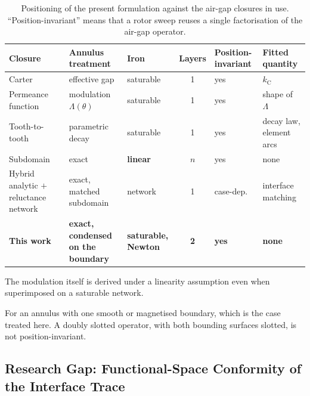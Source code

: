 \documentclass[10pt,a4paper,twocolumn]{article}
\theoremstyle{plain}
\theoremstyle{remark}
\begin{document}
\begin{table}[!t]
\centering
\footnotesize
\begin{threeparttable}
\begin{tabular}{@{}p{26mm}p{27mm}p{19mm}cp{16mm}p{22mm}@{}}
\toprule
Closure & Annulus treatment & Iron & Layers & Position-invariant & Fitted quantity\\
\midrule
Carter~\cite{carter,pyrhonen}      & effective gap             & saturable & 1 & yes & $k_{\mathrm{C}}$\\[2pt]
Permeance function~\cite{zhu1993,zarko2006b} & modulation $\Lambda(\theta)$ & saturable\tnote{*} & 1 & yes & shape of $\Lambda$\\[2pt]
Tooth-to-tooth~\cite{silva2023,ghods2022} & parametric decay & saturable & 1 & yes & decay law, element arcs\\[2pt]
Subdomain~\cite{lubin2010,dubas,boughrara} & exact             & \textbf{linear} & $n$ & yes & none\\[2pt]
Hybrid analytic $+$ reluctance network~\cite{ouagued2016,belmahi2026} & exact, matched subdomain & network & 1 & case-dep. & interface matching\\[2pt]
\textbf{This work}                 & \textbf{exact, condensed on the boundary} & \textbf{saturable, Newton} & \textbf{2} & \textbf{yes\tnote{\dag}} & \textbf{none}\\
\bottomrule
\end{tabular}
\begin{tablenotes}[flushleft]\footnotesize
\item[*] The modulation itself is derived under a linearity assumption
even when superimposed on a saturable network.
\item[\dag] For an annulus with one smooth or magnetised boundary,
which is the case treated here. A doubly slotted operator, with both
bounding surfaces slotted, is not position-invariant.
\end{tablenotes}
\end{threeparttable}
\caption{Positioning of the present formulation against the air-gap
closures in use. ``Position-invariant'' means that a rotor sweep reuses
a single factorisation of the air-gap operator.}
\label{tab:position}
\end{table}

\subsection{Research Gap: Functional-Space Conformity of the Interface Trace}
\end{document}
